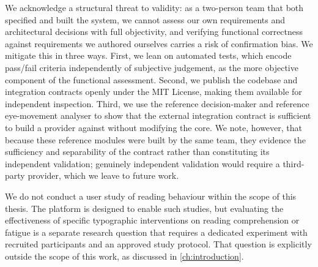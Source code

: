We acknowledge a structural threat to validity: as a two-person team that both specified and built the system, we cannot assess our own requirements and architectural decisions with full objectivity, and verifying functional correctness against requirements we authored ourselves carries a risk of confirmation bias.
We mitigate this in three ways.
First, we lean on automated tests, which encode pass/fail criteria independently of subjective judgement, as the more objective component of the functional assessment.
Second, we publish the codebase and integration contracts openly under the MIT License, making them available for independent inspection.
Third, we use the reference decision-maker and reference eye-movement analyser to show that the external integration contract is sufficient to build a provider against without modifying the core.
We note, however, that because these reference modules were built by the same team, they evidence the sufficiency and separability of the contract rather than constituting its independent validation; genuinely independent validation would require a third-party provider, which we leave to future work.

We do not conduct a user study of reading behaviour within the scope of this thesis.
The platform is designed to enable such studies, but evaluating the effectiveness of specific typographic interventions on reading comprehension or fatigue is a separate research question that requires a dedicated experiment with recruited participants and an approved study protocol.
That question is explicitly outside the scope of this work, as discussed in \cref{ch:introduction}.
